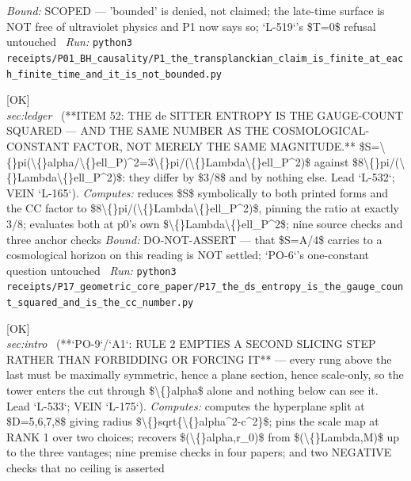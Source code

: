 \begin{description}
 \emph{Bound:} SCOPED --- 'bounded' is denied, not claimed; the late-time surface is NOT free of ultraviolet physics and P1 now says so; `L-519`'s \$T=0\$ refusal untouched
\ \emph{Run:} \texttt{python3 receipts/P01\_BH\_causality/P1\_the\_transplanckian\_claim\_is\_finite\_at\_each\_finite\_time\_and\_it\_is\_not\_bounded.py}
\item[\label{rcpt:P17_the_ds_entropy_is_the_gauge_count_squared_and_is_the_cc_number}\texttt{P17\_the\_ds\_entropy\_is\_the\_gauge\_count\_squared\_and\_is\_the\_cc\_number}]\hfill\textsf{[OK]}\\
\textit{sec:ledger} \ (**ITEM 52: THE de SITTER ENTROPY IS THE GAUGE-COUNT SQUARED --- AND THE SAME NUMBER AS THE COSMOLOGICAL-CONSTANT FACTOR, NOT MERELY THE SAME MAGNITUDE.** \$S=\textbackslash\{\}pi(\textbackslash\{\}alpha/\textbackslash\{\}ell\_P)\textasciicircum{}2=3\textbackslash\{\}pi/(\textbackslash\{\}Lambda\textbackslash\{\}ell\_P\textasciicircum{}2)\$ against \$8\textbackslash\{\}pi/(\textbackslash\{\}Lambda\textbackslash\{\}ell\_P\textasciicircum{}2)\$: they differ by \$3/8\$ and by nothing else. Lead `L-532`; VEIN `L-165`). 
\emph{Computes:} reduces \$S\$ symbolically to both printed forms and the CC factor to \$8\textbackslash\{\}pi/(\textbackslash\{\}Lambda\textbackslash\{\}ell\_P\textasciicircum{}2)\$, pinning the ratio at exactly 3/8; evaluates both at p0's own \$\textbackslash\{\}Lambda\textbackslash\{\}ell\_P\textasciicircum{}2\$; nine source checks and three anchor checks
 \emph{Bound:} DO-NOT-ASSERT --- that \$S=A/4\$ carries to a cosmological horizon on this reading is NOT settled; `PO-6`'s one-constant question untouched
\ \emph{Run:} \texttt{python3 receipts/P17\_geometric\_core\_paper/P17\_the\_ds\_entropy\_is\_the\_gauge\_count\_squared\_and\_is\_the\_cc\_number.py}
\item[\label{rcpt:E50_a_second_step_is_emptied_by_rule_two_and_not_forbidden_by_it}\texttt{E50\_a\_second\_step\_is\_emptied\_by\_rule\_two\_and\_not\_forbidden\_by\_it}]\hfill\textsf{[OK]}\\
\textit{sec:intro} \ (**`PO-9`/`A1`: RULE 2 EMPTIES A SECOND SLICING STEP RATHER THAN FORBIDDING OR FORCING IT** --- every rung above the last must be maximally symmetric, hence a plane section, hence scale-only, so the tower enters the cut through \$\textbackslash\{\}alpha\$ alone and nothing below can see it. Lead `L-533`; VEIN `L-175`). 
\emph{Computes:} computes the hyperplane split at \$D=5,6,7,8\$ giving radius \$\textbackslash\{\}sqrt\{\textbackslash\{\}alpha\textasciicircum{}2-c\textasciicircum{}2\}\$; pins the scale map at RANK 1 over two choices; recovers \$(\textbackslash\{\}alpha,r\_0)\$ from \$(\textbackslash\{\}Lambda,M)\$ up to the three vantages; nine premise checks in four papers; and two NEGATIVE checks that no ceiling is asserted

\end{description}
